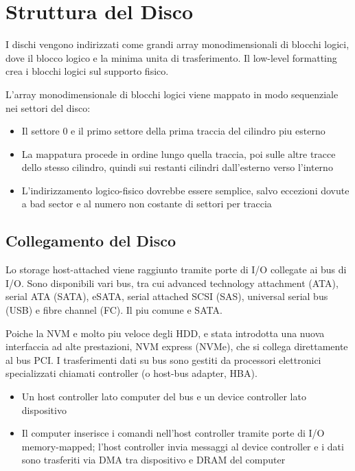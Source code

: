 \section{Struttura del Disco}


I dischi vengono indirizzati come grandi array monodimensionali di blocchi logici,
dove il blocco logico e la minima unita di trasferimento.
Il low-level formatting crea i blocchi logici sul supporto fisico.

L'array monodimensionale di blocchi logici viene mappato in modo sequenziale
nei settori del disco:

\begin{itemize}
  \item Il settore 0 e il primo settore della prima traccia del cilindro piu esterno
  \item La mappatura procede in ordine lungo quella traccia, poi sulle altre tracce dello stesso cilindro, quindi sui restanti cilindri dall'esterno verso l'interno
  \item L'indirizzamento logico-fisico dovrebbe essere semplice, salvo eccezioni dovute a bad sector e al numero non costante di settori per traccia
\end{itemize}

\subsection{Collegamento del Disco}

Lo storage host-attached viene raggiunto tramite porte di I/O collegate ai bus di I/O. Sono disponibili vari bus,
tra cui advanced technology attachment (ATA), serial ATA (SATA), eSATA, serial attached SCSI (SAS),
universal serial bus (USB) e fibre channel (FC). Il piu comune e SATA.

Poiche la NVM e molto piu veloce degli HDD, e stata introdotta una nuova interfaccia ad alte prestazioni,
NVM express (NVMe), che si collega direttamente al bus PCI.
I trasferimenti dati su bus sono gestiti da processori elettronici specializzati chiamati
controller (o host-bus adapter, HBA).

\begin{itemize}
  \item Un host controller lato computer del bus e un device controller lato dispositivo
  \item Il computer inserisce i comandi nell'host controller tramite porte di I/O memory-mapped; l'host controller invia messaggi al device controller e i dati sono trasferiti via DMA tra dispositivo e DRAM del computer
\end{itemize}


